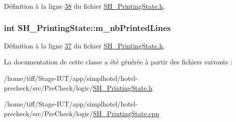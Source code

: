 Définition à la ligne \hyperlink{SH__PrintingState_8h_source_l00038}{38} du fichier \hyperlink{SH__PrintingState_8h_source}{S\-H\-\_\-\-Printing\-State.\-h}.

\hypertarget{classSH__PrintingState_ad90a15a7d50f0c67777d593ae10a8881}{
\subsubsection[{m\-\_\-nb\-Printed\-Lines}]{\setlength{\rightskip}{0pt plus 5cm}int S\-H\-\_\-\-Printing\-State\-::m\-\_\-nb\-Printed\-Lines\hspace{0.3cm}{\ttfamily [private]}}}\label{classSH__PrintingState_ad90a15a7d50f0c67777d593ae10a8881}


Définition à la ligne \hyperlink{SH__PrintingState_8h_source_l00037}{37} du fichier \hyperlink{SH__PrintingState_8h_source}{S\-H\-\_\-\-Printing\-State.\-h}.



La documentation de cette classe a été générée à partir des fichiers suivants \-:\begin{DoxyCompactItemize}
\item 
/home/tiff/\-Stage-\/\-I\-U\-T/app/simplhotel/hotel-\/precheck/src/\-Pre\-Check/logic/\hyperlink{SH__PrintingState_8h}{S\-H\-\_\-\-Printing\-State.\-h}\item 
/home/tiff/\-Stage-\/\-I\-U\-T/app/simplhotel/hotel-\/precheck/src/\-Pre\-Check/logic/\hyperlink{SH__PrintingState_8cpp}{S\-H\-\_\-\-Printing\-State.\-cpp}\end{DoxyCompactItemize}
